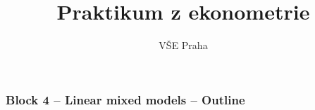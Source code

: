\documentclass{beamer}
\title[Block 4]{Praktikum z ekonometrie} %
\author{VŠE Praha} %
\institute[4EK417] %
{
\medskip
\textit{Tomáš Formánek} %
}
\date{} %
\begin{document}
\begin{frame}
\titlepage %
\end{frame}
\begin{frame}
\frametitle{Block 4 – Linear mixed models – Outline
} %
\tableofcontents %
\end{frame}

\end{document}
